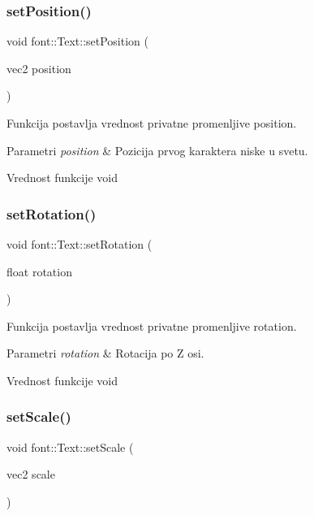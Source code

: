 \subsubsection{\texorpdfstring{set\+Position()}{setPosition()}}
{\footnotesize\ttfamily void font\+::\+Text\+::set\+Position (\begin{DoxyParamCaption}\item[{vec2}]{position }\end{DoxyParamCaption})}



Funkcija postavlja vrednost privatne promenljive position. 


\begin{DoxyParams}{Parametri}
{\em position} & Pozicija prvog karaktera niske u svetu. \\
\hline
\end{DoxyParams}
\begin{DoxyReturn}{Vrednost funkcije}
void 
\end{DoxyReturn}
\mbox{\label{classfont_1_1Text_a4687ff4053103b3fdf730fd8585aea7e}} 
\subsubsection{\texorpdfstring{set\+Rotation()}{setRotation()}}
{\footnotesize\ttfamily void font\+::\+Text\+::set\+Rotation (\begin{DoxyParamCaption}\item[{float}]{rotation }\end{DoxyParamCaption})}



Funkcija postavlja vrednost privatne promenljive rotation. 


\begin{DoxyParams}{Parametri}
{\em rotation} & Rotacija po Z osi. \\
\hline
\end{DoxyParams}
\begin{DoxyReturn}{Vrednost funkcije}
void 
\end{DoxyReturn}
\mbox{\label{classfont_1_1Text_ab2162e943ec0ab36a19a2762e1352369}} 
\subsubsection{\texorpdfstring{set\+Scale()}{setScale()}}
{\footnotesize\ttfamily void font\+::\+Text\+::set\+Scale (\begin{DoxyParamCaption}\item[{vec2}]{scale }\end{DoxyParamCaption})}



